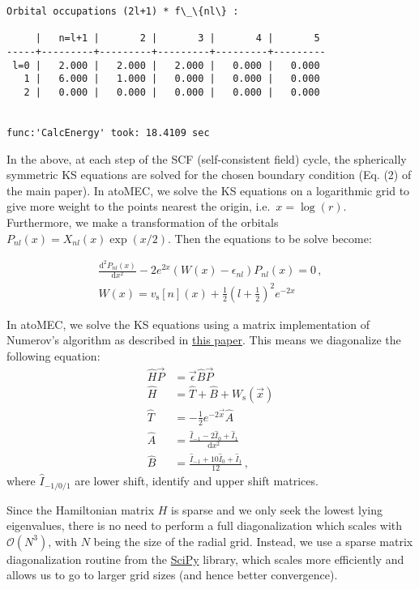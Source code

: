 \documentclass[11pt]{article}
\begin{document}
\begin{Verbatim}[commandchars=\\\{\}]
Orbital occupations (2l+1) * f\_\{nl\} :

     |   n=l+1 |       2 |       3 |       4 |       5
-----+---------+---------+---------+---------+---------
 l=0 |   2.000 |   2.000 |   2.000 |   0.000 |   0.000
   1 |   6.000 |   1.000 |   0.000 |   0.000 |   0.000
   2 |   0.000 |   0.000 |   0.000 |   0.000 |   0.000


func:'CalcEnergy' took: 18.4109 sec
    \end{Verbatim}

    In the above, at each step of the SCF (self-consistent field) cycle, the
spherically symmetric KS equations are solved for the chosen boundary
condition (Eq. (2) of the main paper). In atoMEC, we solve the KS
equations on a logarithmic grid to give more weight to the points
nearest the origin, i.e.~\(x=\log(r)\). Furthermore, we make a
transformation of the orbitals \(P_{nl}(x) = X_{nl}(x)\exp(x/2)\). Then
the equations to be solve become:

\begin{gather}
\frac{\textrm{d}^2 P_{nl}(x)}{\textrm{d}x^2} - 2e^{2x}(W(x)-\epsilon_{nl})P_{nl}(x)=0\,,\\
W(x) = v_\textrm{s}[n](x) + \frac{1}{2}\left(l+\frac{1}{2}\right)^2 e^{-2x}
\end{gather}

In atoMEC, we solve the KS equations using a matrix implementation of
Numerov's algorithm as described in
\href{https://aapt.scitation.org/doi/full/10.1119/1.4748813?casa_token=UMs6bxc3iB0AAAAA\%3AonvjnFq-KyEXZpEzUfGfyqQoNrMoP6AI0Wi7nrZrILOCM9Ah55XACGen5VLr-civFUtr2sVuCpw}{this
paper}. This means we diagonalize the following equation: \begin{align}
\hat{H}\vec{P} &= \vec{\epsilon} \hat{B} \vec{P} \\
\hat{H} &= \hat{T} + \hat{B} + W_\textrm{s}(\vec{x}) \\
\hat{T} &= -\frac{1}{2} e^{-2\vec{x}} \hat{A} \\
\hat{A} &= \frac{\hat{I}_{-1} -2\hat{I}_0 + \hat{I}_1}{\textrm{d}x^2} \\
\hat{B} &= \frac{\hat{I}_{-1} +10\hat{I}_0 + \hat{I}_1}{12}\,,
\end{align} where \(\hat{I}_{-1/0/1}\) are lower shift, identify and
upper shift matrices.

Since the Hamiltonian matrix \(H\) is sparse and we only seek the lowest
lying eigenvalues, there is no need to perform a full diagonalization
which scales with \(\mathcal{O}(N^3)\), with \(N\) being the size of the
radial grid. Instead, we use a sparse matrix diagonalization routine
from the \href{https://scipy.org/}{SciPy} library, which scales more
efficiently and allows us to go to larger grid sizes (and hence better
convergence).
\end{document}
